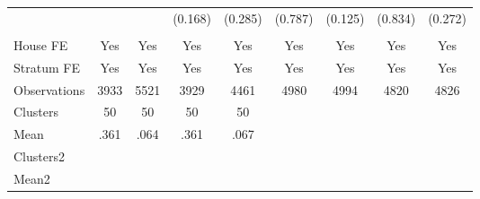 {\begin{tabular}{l*{8}{c}}
                &         &         &  (0.168)&  (0.285)&  (0.787)&  (0.125)&  (0.834)&  (0.272)\\
                &         &         &         &         &         &         &         &         \\
House FE        &      Yes&      Yes&      Yes&      Yes&      Yes&      Yes&      Yes&      Yes\\
Stratum FE      &      Yes&      Yes&      Yes&      Yes&      Yes&      Yes&      Yes&      Yes\\
\midrule
Observations    &     3933&     5521&     3929&     4461&     4980&     4994&     4820&     4826\\
Clusters        &       50&       50&       50&       50&         &         &         &         \\
Mean            &     .361&     .064&     .361&     .067&         &         &         &         \\
Clusters2       &         &         &         &         &         &         &         &         \\
Mean2           &         &         &         &         &         &         &         &         \\
\bottomrule
\end{tabular}
}
